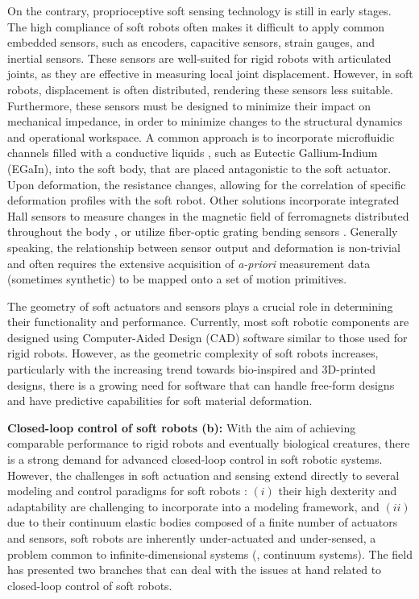 On the contrary, proprioceptive soft sensing technology is still in early stages. The high compliance of soft robots often makes it difficult to apply common embedded sensors, such as encoders, capacitive sensors, strain gauges, and inertial sensors. These sensors are well-suited for rigid robots with articulated joints, as they are effective in measuring local joint displacement. However, in soft robots, displacement is often distributed, rendering these sensors less suitable. Furthermore, these sensors must be designed to minimize their impact on mechanical impedance, in order to minimize changes to the structural dynamics and operational workspace. A common approach is to incorporate microfluidic channels filled with a conductive liquids \cite{Tapia2020,Teng2018,Park2012}, such as Eutectic Gallium-Indium (EGaIn), into the soft body, that are placed antagonistic to the soft actuator. Upon deformation, the resistance changes, allowing for the correlation of specific deformation profiles with the soft robot. Other solutions incorporate integrated Hall sensors to measure changes in the magnetic field of ferromagnets distributed throughout the body \cite{Baaij2023,Skorina2017Jan}, or utilize fiber-optic grating bending sensors \cite{Galloway2019}. Generally speaking, the relationship between sensor output and deformation is non-trivial and often requires the extensive acquisition of \textit{a-priori} measurement data (sometimes synthetic) to be mapped onto a set of motion primitives.

The geometry of soft actuators and sensors plays a crucial role in determining their functionality and performance. Currently, most soft robotic components are designed using Computer-Aided Design (CAD) software similar to those used for rigid robots. However, as the geometric complexity of soft robots increases, particularly with the increasing trend towards bio-inspired and 3D-printed designs, there is a growing need for software that can handle free-form designs and have predictive capabilities for soft material deformation.

\textbf{Closed-loop control of soft robots (b):} With the aim of achieving comparable performance to rigid robots and eventually biological creatures, there is a strong demand for advanced closed-loop control in soft robotic systems. However, the challenges in soft actuation and sensing extend directly to several modeling and control paradigms for soft robots \cite{Armanini2023,DellaSantina2021}: $(i)$ their high dexterity and adaptability are challenging to incorporate into a modeling framework, and $(ii)$ due to their continuum elastic bodies composed of a finite number of actuators and sensors, soft robots are inherently under-actuated and under-sensed, a problem common to infinite-dimensional systems (\eg, continuum systems). The field has presented two branches that can deal with the issues at hand related to closed-loop control of soft robots.

